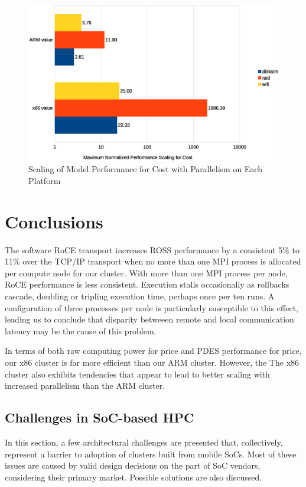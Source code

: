 \documentclass[11pt]{book}
\begin{document}
\begin{figure}
\centering
\includegraphics[width=\textwidth]{costperf_summary}
\caption{Scaling of Model Performance for Cost with Parallelism on Each Platform}
\label{costperf-summary}
\end{figure}

\chapter{Conclusions}\label{conclusions}

The software RoCE transport increases ROSS performance by a consistent 5\% to
11\% over the TCP/IP transport when no more than one MPI process is allocated
per compute node for our cluster. With more than one MPI process per node, RoCE
performance is less consistent. Execution stalls occasionally as rollbacks
cascade, doubling or tripling execution time, perhaps once per ten runs. A
configuration of three processes per node is particularly susceptible to this
effect, leading us to conclude that disparity betweeen remote and local
communication latency may be the cause of this problem.

In terms of both raw computing power for price and PDES performance for price,
our x86 cluster is far more efficient than our ARM cluster. However, the The x86 cluster also
exhibits tendencies that appear to lead to better scaling with increased
parallelism than the ARM cluster.

\section{\textbf{Challenges in SoC-based HPC}}

In this section, a few architectural challenges are presented that,
collectively, represent a barrier to adoption of clusters built from mobile
SoCs. Most of these issues are caused by valid design decisions on the part of
SoC vendors, considering their primary market. Possible solutions are also
discussed.
\end{document}
